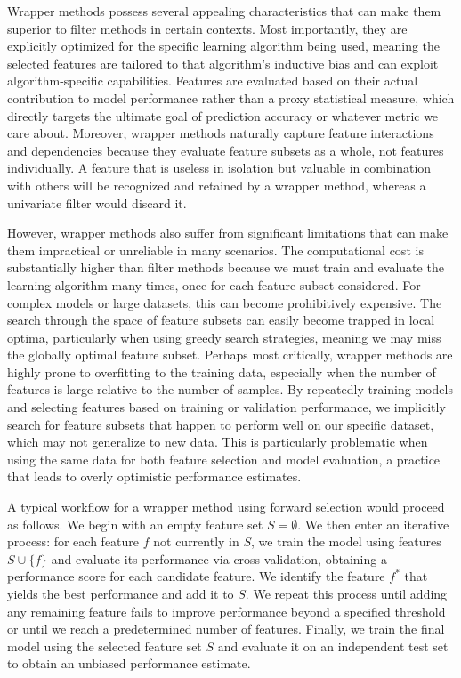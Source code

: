 Wrapper methods possess several appealing characteristics that can make them superior to filter methods in certain contexts. Most importantly, they are explicitly optimized for the specific learning algorithm being used, meaning the selected features are tailored to that algorithm's inductive bias and can exploit algorithm-specific capabilities. Features are evaluated based on their actual contribution to model performance rather than a proxy statistical measure, which directly targets the ultimate goal of prediction accuracy or whatever metric we care about. Moreover, wrapper methods naturally capture feature interactions and dependencies because they evaluate feature subsets as a whole, not features individually. A feature that is useless in isolation but valuable in combination with others will be recognized and retained by a wrapper method, whereas a univariate filter would discard it.

However, wrapper methods also suffer from significant limitations that can make them impractical or unreliable in many scenarios. The computational cost is substantially higher than filter methods because we must train and evaluate the learning algorithm many times, once for each feature subset considered. For complex models or large datasets, this can become prohibitively expensive. The search through the space of feature subsets can easily become trapped in local optima, particularly when using greedy search strategies, meaning we may miss the globally optimal feature subset. Perhaps most critically, wrapper methods are highly prone to overfitting to the training data, especially when the number of features is large relative to the number of samples. By repeatedly training models and selecting features based on training or validation performance, we implicitly search for feature subsets that happen to perform well on our specific dataset, which may not generalize to new data. This is particularly problematic when using the same data for both feature selection and model evaluation, a practice that leads to overly optimistic performance estimates.

A typical workflow for a wrapper method using forward selection would proceed as follows. We begin with an empty feature set $S = \emptyset$. We then enter an iterative process: for each feature $f$ not currently in $S$, we train the model using features $S \cup \{f\}$ and evaluate its performance via cross-validation, obtaining a performance score for each candidate feature. We identify the feature $f^*$ that yields the best performance and add it to $S$. We repeat this process until adding any remaining feature fails to improve performance beyond a specified threshold or until we reach a predetermined number of features. Finally, we train the final model using the selected feature set $S$ and evaluate it on an independent test set to obtain an unbiased performance estimate.

